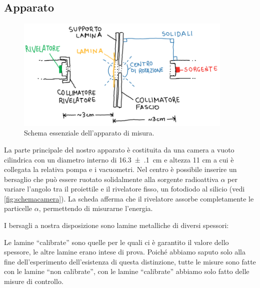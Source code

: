 \subsection{Apparato}

\begin{figure}
	\centering
	\includegraphics[width=28em]{immagini/schemacamera}
	\caption{\label{fig:schemacamera}
	Schema essenziale dell'apparato di misura.}
\end{figure}

La parte principale del nostro apparato è costituita da una camera a vuoto cilindrica con un diametro interno di  \SI{16.3(1)}{cm} e altezza 11 cm a cui è collegata la relativa pompa e i vacuometri.
Nel centro è possibile inserire un bersaglio che può essere ruotato solidalmente alla sorgente radioattiva $\alpha$
per variare l'angolo tra il proiettile e il rivelatore fisso, un fotodiodo al silicio (vedi \autoref{fig:schemacamera}).
La scheda afferma che il rivelatore assorbe completamente le particelle $\alpha$,
permettendo di misurarne l'energia.

I bersagli a nostra disposizione sono lamine metalliche di diversi spessori:
Le lamine ``calibrate'' sono quelle per le quali ci è garantito il valore dello spessore,
le altre lamine erano intese di prova.
Poiché abbiamo saputo solo alla fine dell'esperimento dell'esistenza di questa distinzione,
tutte le misure sono fatte con le lamine ``non calibrate'',
con le lamine ``calibrate'' abbiamo solo fatto delle misure di controllo.

